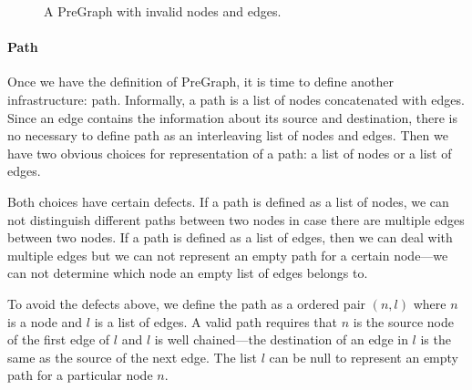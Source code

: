 \begin{figure}
\centering
{}
\endpgfgraphicnamed
\vspace{1ex}
\caption{A PreGraph with invalid nodes and edges.}\label{fig:pregraph}
\end{figure}

\paragraph{Path}
Once we have the definition of PreGraph, it is time to define another
infrastructure: path. Informally, a path is a list of nodes
concatenated with edges. Since an edge contains the information about
its source and destination, there is no necessary to define path as an
interleaving list of nodes and edges. Then we have two obvious choices
for representation of a path: a list of nodes or a list of edges.

Both choices have certain defects. If a path is defined as a list of
nodes, we can not distinguish different paths between two nodes in
case there are multiple edges between two nodes. If a path is defined
as a list of edges, then we can deal with multiple edges but we can
not represent an empty path for a certain node---we can not determine
which node an empty list of edges belongs to.

To avoid the defects above, we define the path as a ordered pair $(n,
l)$ where $n$ is a node and $l$ is a list of edges. A valid path
requires that $n$ is the source node of the first edge of $l$ and $l$
is well chained---the destination of an edge in $l$ is the same as the
source of the next edge. The list $l$ can be null to represent an
empty path for a particular node $n$.

